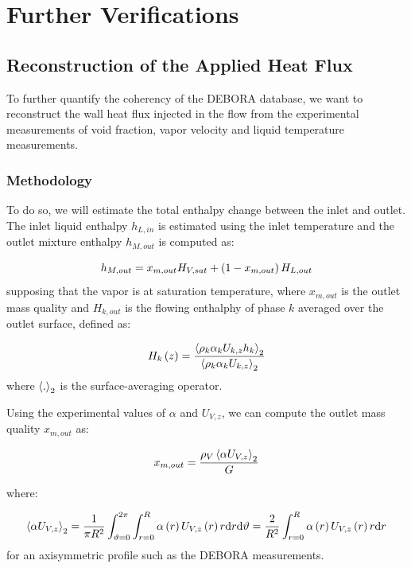 \section{Further Verifications}


\subsection{Reconstruction of the Applied Heat Flux}
\label{subsec:deb_phi_corr}


To further quantify the coherency of the DEBORA database, we want to reconstruct the wall heat flux injected in the flow from the experimental measurements of void fraction, vapor velocity and liquid temperature measurements.

\subsubsection{Methodology}

To do so, we will estimate the total enthalpy change between the inlet and outlet. The inlet liquid enthalpy $h_{L,in}$ is estimated using the inlet temperature and the outlet mixture enthalpy $h_{M,out}$ is computed as:

\begin{equation}
h_{M,out}=x_{m,out}H_{V,sat}+\left( 1-x_{m,out} \right)H_{L,out}
\end{equation}
supposing that the vapor is at saturation temperature, where $x_{m,out}$ is the outlet mass quality and $H_{k,out}$ is the flowing enthalphy of phase $k$ averaged over the outlet surface, defined as:

\begin{equation}
H_{k}\left( z \right) = \frac{\left< \rho_{k}\alpha_{k}U_{k,z} h_{k} \right>_{2}}{\left<  \rho_{k}\alpha_{k}U_{k,z} \right>_{2}}
\end{equation}
where $\left< . \right>_{2}$ is the surface-averaging operator.


\npar
Using the experimental values of $\alpha$ and $U_{V,z}$, we can compute the outlet mass quality $x_{m,out}$ as:

\begin{equation}
x_{m,out} = \frac{\rho_{V}\left< \alpha U_{V,z} \right>_{2}}{G}
\end{equation}

where:

\begin{equation}
\left< \alpha U_{V,z} \right>_{2} = \frac{1}{\pi R^{2}}\int_{\vartheta=0}^{2\pi} \int_{r=0}^{R} \alpha\left( r \right) U_{V,z}\left( r \right) r \mathrm{d}r \mathrm{d}\vartheta = \frac{2}{R^{2}}\int_{r=0}^{R}  \alpha\left( r \right) U_{V,z}\left( r \right) r \mathrm{d}r
\end{equation}
for an axisymmetric profile such as the DEBORA measurements.

